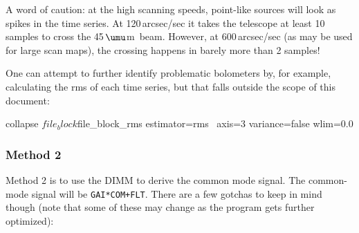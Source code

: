 \documentclass[twoside,11pt]{starlink}
\providecommand{\micron}{\mbox{\,${\umu}$m}}            %
\begin{document}
A word of caution: at the high scanning speeds, point-like sources
will look as spikes in the time series. At 120\,arcsec/sec it takes the
telescope at least 10 samples to cross the 45\micron\ beam. However, at
600\,arcsec/sec (as may be used for large scan maps), the crossing happens in
barely more than 2 samples!

One can attempt to further identify problematic bolometers by,
for example, calculating the rms of each time series, but that falls outside
the scope of this document:

\begin{terminalv}
collapse ${file}_block ${file}_block_rms estimator=rms \
         axis=3 variance=false wlim=0.0
\end{terminalv}

\subsubsection{Method 2}
\label{sec:method2}

Method 2 is to use the DIMM to derive the common mode signal. The
common-mode signal will be \texttt{GAI*COM+FLT}. There are a few gotchas to
keep in mind though (note that some of these may change as the program
gets further optimized):
\end{document}
